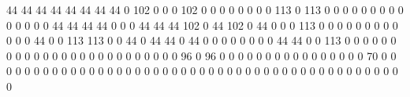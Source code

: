 44 44 44 44 44 44 44 44 0 102 0 0 0 102 0 0 0 0 0 0 0 0 113 0 113 0 0 0 0 0 0 0 0 0 0 0 0 0 0 44 44 44 44 0 0 0 44 44 44 102 0 44 102 0 44 0 0 0 113 0 0 0 0 0 0 0 0 0 0 0 0 44 0 0 113 113 0 0 44 0 44 44 0 44 0 0 0 0 0 0 0 0 44 44 0 0 113 0 0 0 0 0 0 0 0 0 0 0 0 0 0 0 0 0 0 0 0 0 0 0 0 0 96 0 96 0 0 0 0 0 0 0 0 0 0 0 0 0 0 0 0 70 0 0 0 0 0 0 0 0 0 0 0 0 0 0 0 0 0 0 0 0 0 0 0 0 0 0 0 0 0 0 0 0 0 0 0 0 0 0 0 0 0 0 0 0 0 0